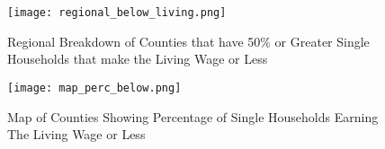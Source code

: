 \begin{figure}[H]
    \centering
        \texttt{[image: regional\_below\_living.png]}
        \caption{Regional Breakdown of Counties that have 50\% or Greater Single Households that make the Living Wage or Less}
    \label{f:ch5_regional_below_living}
\end{figure}

\begin{figure}[H]
\texttt{[image: map\_perc\_below.png]}
    \centering
        \caption{Map of Counties Showing Percentage of Single Households Earning The Living Wage or Less}
    \label{f:ch5_map_perc_below}
\end{figure}